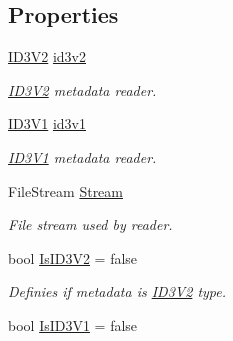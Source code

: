 \subsection*{Properties}
\begin{DoxyCompactItemize}
\item 
\mbox{\hyperlink{classOSML_1_1Media_1_1Metadata_1_1ID3_1_1ID3V2}{I\+D3\+V2}} \mbox{\hyperlink{classOSML_1_1Media_1_1Metadata_1_1ID3_1_1ID3Reader_acb92e1d2457bdd98406dfe59ae2ebbb6}{id3v2}}
\begin{DoxyCompactList}\small\item\em \mbox{\hyperlink{classOSML_1_1Media_1_1Metadata_1_1ID3_1_1ID3V2}{I\+D3\+V2}} metadata reader. \end{DoxyCompactList}\item 
\mbox{\hyperlink{classOSML_1_1Media_1_1Metadata_1_1ID3_1_1ID3V1}{I\+D3\+V1}} \mbox{\hyperlink{classOSML_1_1Media_1_1Metadata_1_1ID3_1_1ID3Reader_a957199760e0d1b56df9ae1df880c080c}{id3v1}}
\begin{DoxyCompactList}\small\item\em \mbox{\hyperlink{classOSML_1_1Media_1_1Metadata_1_1ID3_1_1ID3V1}{I\+D3\+V1}} metadata reader. \end{DoxyCompactList}\item 
File\+Stream \mbox{\hyperlink{classOSML_1_1Media_1_1Metadata_1_1ID3_1_1ID3Reader_a30391f033a3b1d5fb7a5d816993c05e0}{Stream}}
\begin{DoxyCompactList}\small\item\em File stream used by reader. \end{DoxyCompactList}\item 
bool \mbox{\hyperlink{classOSML_1_1Media_1_1Metadata_1_1ID3_1_1ID3Reader_af743e2855cd2631ca9c72db8072e6e15}{Is\+I\+D3\+V2}} = false
\begin{DoxyCompactList}\small\item\em Definies if metadata is \mbox{\hyperlink{classOSML_1_1Media_1_1Metadata_1_1ID3_1_1ID3V2}{I\+D3\+V2}} type. \end{DoxyCompactList}\item 
bool \mbox{\hyperlink{classOSML_1_1Media_1_1Metadata_1_1ID3_1_1ID3Reader_a4968a86a1e1334c5b450032fbc177fe4}{Is\+I\+D3\+V1}} = false

\end{DoxyCompactItemize}
